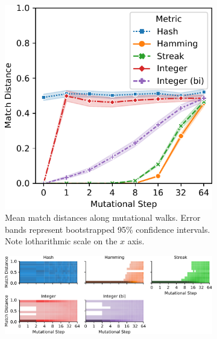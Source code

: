 \begin{figure}[!htbp]
\begin{center}

\begin{subfigure}[b]{\linewidth}
\begin{minipage}{\linewidth}
\centering
\includegraphics[width=0.75\linewidth]{img/mutational_walk/bitweight=0dot5+seed=1+title=mutational_walk_lineplot_ci+_data_hathash_hash=8bf152d87daa9cb7+_script_fullcat_hash=44400a7961ad5f3b+ext=}

\end{minipage}
\begin{minipage}{\linewidth}
\caption{
Mean match distances along mutational walks.
Error bands represent bootstrapped 95\% confidence intervals.
Note lotharithmic scale on the $x$ axis.
}
\end{minipage}
\end{subfigure}

\begin{subfigure}[b]{\linewidth}
\begin{minipage}{\linewidth}
\centering
\includegraphics[width=\linewidth]{img/mutational_walk/bitweight=0dot5+seed=1+title=mutational_walk_heatplot+_data_hathash_hash=8bf152d87daa9cb7+_script_fullcat_hash=d91905e1c51705f0+ext=}


\end{minipage}
\end{subfigure}
\end{center}
\end{figure}
